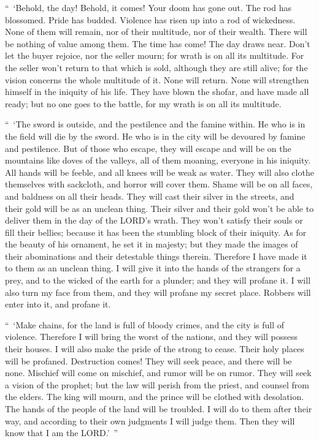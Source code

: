 \myverse{}“ ‘Behold, the day! Behold, it comes! Your doom has gone out.
The rod has blossomed. Pride has budded.
\myverse{}Violence has risen up into a rod of wickedness. None of them will remain,
nor of their multitude, nor of their wealth. There will be nothing of value among them.
\myverse{}The time has come! The day draws near. Don’t let the buyer rejoice, nor the
seller mourn; for wrath is on all its multitude.
\myverse{}For the seller won’t return to that which is sold, although they are still
alive; for the vision concerns the whole multitude of it. None will return. None will strengthen himself
in the iniquity of his life.
\myverse{}They have blown the shofar, and have made all ready; but no one goes to the
battle, for my wrath is on all its multitude.

\myverse{}“ ‘The sword is outside, and the pestilence and the famine within.
He who is in the field will die by the sword. He who is in the city will be devoured by famine and pestilence.
\myverse{}But of those who escape, they will escape and will be on the mountains like
doves of the valleys, all of them moaning, everyone in his iniquity.
\myverse{}All hands will be feeble, and all knees will be weak as water.
\myverse{}They will also clothe themselves with sackcloth, and horror will cover them.
Shame will be on all faces, and baldness on all their heads.
\myverse{}They will cast their silver in the streets, and their gold will be as an unclean
thing. Their silver and their gold won’t be able to deliver them in the day of the LORD’s wrath. They
won’t satisfy their souls or fill their bellies; because it has been the stumbling block of their iniquity.
\myverse{}As for the beauty of his ornament, he set it in majesty; but they made the
images of their abominations and their detestable things therein. Therefore I have made it to them as
an unclean thing.
\myverse{}I will give it into the hands of the strangers for a prey, and to the wicked
of the earth for a plunder; and they will profane it.
\myverse{}I will also turn my face from them, and they will profane my secret place.
Robbers will enter into it, and profane it.

\myverse{}“ ‘Make chains, for the land is full of bloody crimes, and the
city is full of violence.
\myverse{}Therefore I will bring the worst of the nations, and they will possess their
houses. I will also make the pride of the strong to cease. Their holy places will be profaned.
\myverse{}Destruction comes! They will seek peace, and there will be none.
\myverse{}Mischief will come on mischief, and rumor will be on rumor. They will seek
a vision of the prophet; but the law will perish from the priest, and counsel from the elders.
\myverse{}The king will mourn, and the prince will be clothed with desolation. The hands
of the people of the land will be troubled. I will do to them after their way, and according to their
own judgments I will judge them. Then they will know that I am the LORD.’ ”


